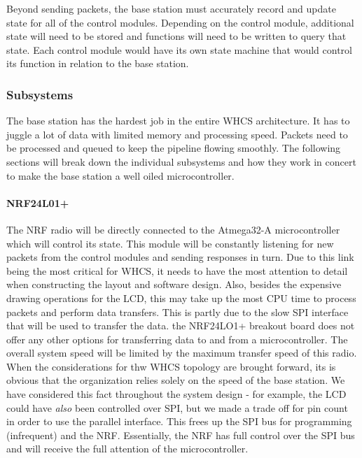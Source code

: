 
Beyond sending packets, the base station must accurately record and update
state for all of the control modules. Depending on the control module,
additional state will need to be stored and functions will need to be written
to query that state. Each control module would have its own state machine that
would control its function in relation to the base station.

%

\subsubsection{Subsystems}
The base station has the hardest job in the entire WHCS architecture. It has to
juggle a lot of data with limited memory and processing speed. Packets need to be
processed and queued to keep the pipeline flowing smoothly. The following
sections will break down the individual subsystems and how they work in concert
to make the base station a well oiled microcontroller.

\paragraph{NRF24L01+}
The NRF radio will be directly connected to the Atmega32-A microcontroller
which will control its state. This module will be constantly listening for new
packets from the control modules and sending responses in turn. Due to this
link being the most critical for WHCS, it needs to have the most attention to
detail when constructing the layout and software design. Also, besides the
expensive drawing operations for the LCD, this may take up the most CPU time to
process packets and perform data transfers. This is partly due to the slow SPI
interface that will be used to transfer the data. the NRF24LO1+ breakout board
does not offer any other options for transferring data to and from a
microcontroller. The overall system speed will be limited by the maximum
transfer speed of this radio. When the considerations for thw WHCS topology are
brought forward, its is obvious that the organization relies solely on the
speed of the base station. We have considered this fact throughout the system
design - for example, the LCD could have \emph{also} been controlled over SPI,
but we made a trade off for pin count in order to use the parallel interface.
This frees up the SPI bus for programming (infrequent) and the NRF.
Essentially, the NRF has full control over the SPI bus and will receive the
full attention of the microcontroller. 


